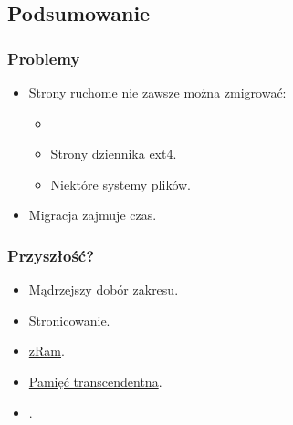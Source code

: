 
\subsection{Podsumowanie}

\begin{frame}
  \frametitle{Problemy}

  \begin{itemize}
  \item Strony ruchome nie zawsze można zmigrować:
    \begin{itemize}
    \item {}
    \item Strony dziennika ext4.
    \item Niektóre systemy plików.
    \end{itemize}
  \item Migracja zajmuje czas.
  \end{itemize}
\end{frame}

\begin{frame}
  \frametitle{Przyszłość?}
  \begin{itemize}
  \item Mądrzejszy dobór zakresu.
  \end{itemize}

  \begin{itemize}
  \item Stronicowanie.
  \item \href{http://code.google.com/p/compcache}{zRam}.
  \item \href{http://lwn.net/Articles/340080/}{Pamięć transcendentna}.
  \item \href{http://lwn.net/Articles/468896/}{}.
  \end{itemize}
\end{frame}
